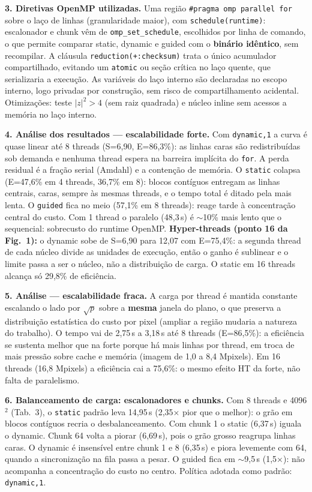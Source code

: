 \documentclass[10pt,a4paper,twocolumn]{article}
\begin{document}
\textbf{3. Diretivas OpenMP utilizadas.}
Uma região \texttt{\#pragma omp parallel for} sobre o laço de linhas
(granularidade maior), com \texttt{schedule(runtime)}: escalonador e chunk vêm
de \texttt{omp_set_schedule}, escolhidos por linha de comando, o que permite
comparar static, dynamic e guided com o \textbf{binário idêntico}, sem
recompilar. A cláusula \texttt{reduction(+:checksum)} trata o único acumulador
compartilhado, evitando um \texttt{atomic} ou seção crítica no laço quente,
que serializaria a execução. As variáveis do laço interno são declaradas no
escopo interno, logo privadas por construção, sem risco de compartilhamento
acidental. Otimizações: teste $|z|^2 > 4$ (sem raiz quadrada) e núcleo inline
sem acessos a memória no laço interno.

\textbf{4. Análise dos resultados --- escalabilidade forte.}
Com \texttt{dynamic,1} a curva é quase linear até 8 threads (S=6,90,
E=86,3\%): as linhas caras são redistribuídas sob demanda e nenhuma thread
espera na barreira implícita do \texttt{for}. A perda residual é a fração
serial (Amdahl) e a contenção de memória. O \texttt{static} colapsa (E=47,6\%
em 4 threads, 36,7\% em 8): blocos contíguos entregam as linhas centrais,
caras, sempre às mesmas threads, e o tempo total é ditado pela mais lenta.
O \texttt{guided} fica no meio (57,1\% em 8 threads): reage tarde à
concentração central do custo. Com 1 thread o paralelo (48,3\,s) é $\sim$10\%
mais lento que o sequencial: sobrecusto do runtime OpenMP.
\textbf{Hyper-threads (ponto 16 da Fig.~1):} o dynamic sobe de S=6,90 para
12,07 com E=75,4\%: a segunda thread de cada núcleo divide as unidades de
execução, então o ganho é sublinear e o limite passa a ser o núcleo, não a
distribuição de carga. O static em 16 threads alcança só 29,8\% de eficiência.

\textbf{5. Análise --- escalabilidade fraca.}
A carga por thread é mantida constante escalando o lado por $\sqrt{p}$ sobre
a \textbf{mesma} janela do plano, o que preserva a distribuição estatística
do custo por pixel (ampliar a região mudaria a natureza do trabalho). O tempo
vai de 2,75\,s a 3,18\,s até 8 threads (E=86,5\%): a eficiência se sustenta
melhor que na forte porque há mais linhas por thread, em troca de mais pressão
sobre cache e memória (imagem de 1,0 a 8,4 Mpixels). Em 16 threads (16,8
Mpixels) a eficiência cai a 75,6\%: o mesmo efeito HT da forte, não falta de
paralelismo.

\textbf{6. Balanceamento de carga: escalonadores e chunks.}
Com 8 threads e 4096$^2$ (Tab.~3), o \texttt{static} padrão leva 14,95\,s
(2,35$\times$ pior que o melhor): o grão em blocos contíguos recria o
desbalanceamento. Com chunk 1 o static (6,37\,s) iguala o dynamic. Chunk 64
volta a piorar (6,69\,s), pois o grão grosso reagrupa linhas caras. O dynamic
é insensível entre chunk 1 e 8 (6,35\,s) e piora levemente com 64, quando a
sincronização na fila passa a pesar. O guided fica em $\sim$9,5\,s
(1,5$\times$): não acompanha a concentração do custo no centro. Política
adotada como padrão: \texttt{dynamic,1}.
\end{document}
